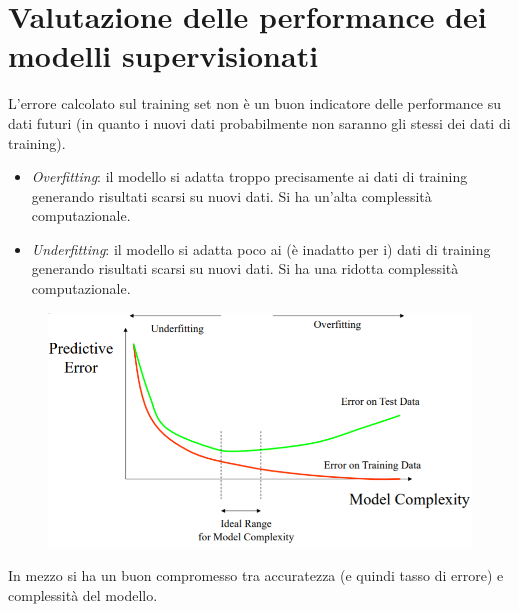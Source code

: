 \section{Valutazione delle performance dei modelli supervisionati}

L’errore calcolato sul training set non è un buon indicatore delle performance su dati futuri (in quanto i nuovi dati probabilmente non saranno gli stessi dei dati di training).
\begin{itemize}
    \item \textit{Overfitting}: il modello si adatta troppo precisamente ai dati di training generando risultati scarsi su nuovi dati. Si ha un’alta complessità computazionale.
    \item \textit{Underfitting}: il modello si adatta poco ai (è inadatto per i) dati di training generando risultati scarsi su nuovi dati. Si ha una ridotta complessità computazionale.
\end{itemize}

\begin{figure}[H]
    \centering
    \includegraphics[scale=0.7]{imm/model_complexity.png}
\end{figure}

In mezzo si ha un buon compromesso tra accuratezza (e quindi tasso di errore) e complessità del modello.\\

